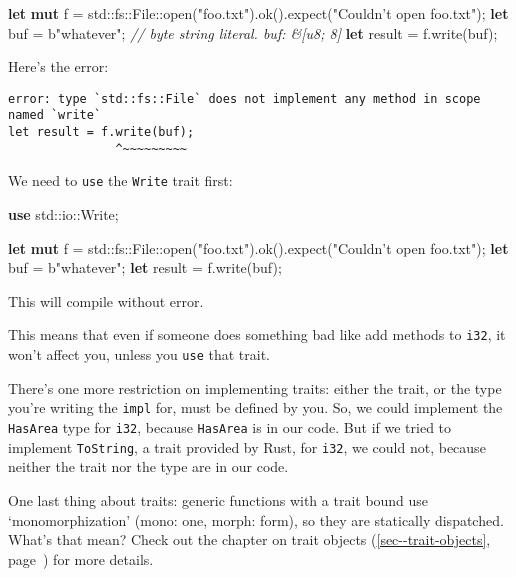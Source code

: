 \documentclass[a4paper,]{book}
\renewcommand*{\hyperref}[2][\ar]{%
  \def\ar{#2}%
  #2 (\autoref{#1}, page~\pageref{#1})}
\newenvironment{Shaded}{\begin{snugshade}}{\end{snugshade}}
\newcommand{\KeywordTok}[1]{\textcolor[rgb]{0.13,0.29,0.53}{\textbf{{#1}}}}
\newcommand{\StringTok}[1]{\textcolor[rgb]{0.31,0.60,0.02}{{#1}}}
\newcommand{\CommentTok}[1]{\textcolor[rgb]{0.56,0.35,0.01}{\textit{{#1}}}}
\newcommand{\NormalTok}[1]{{#1}}
\begin{document}
\begin{Shaded}
\begin{Highlighting}[]
\KeywordTok{let} \KeywordTok{mut} \NormalTok{f = std::fs::File::open(}\StringTok{"foo.txt"}\NormalTok{).ok().expect(}\StringTok{"Couldn’t open foo.txt"}\NormalTok{);}
\KeywordTok{let} \NormalTok{buf = b}\StringTok{"whatever"}\NormalTok{; }\CommentTok{// byte string literal. buf: &[u8; 8]}
\KeywordTok{let} \NormalTok{result = f.write(buf);}
\end{Highlighting}
\end{Shaded}

Here's the error:

\begin{verbatim}
error: type `std::fs::File` does not implement any method in scope named `write`
let result = f.write(buf);
               ^~~~~~~~~~
\end{verbatim}

We need to \texttt{use} the \texttt{Write} trait first:

\begin{Shaded}
\begin{Highlighting}[]
\KeywordTok{use} \NormalTok{std::io::Write;}

\KeywordTok{let} \KeywordTok{mut} \NormalTok{f = std::fs::File::open(}\StringTok{"foo.txt"}\NormalTok{).ok().expect(}\StringTok{"Couldn’t open foo.txt"}\NormalTok{);}
\KeywordTok{let} \NormalTok{buf = b}\StringTok{"whatever"}\NormalTok{;}
\KeywordTok{let} \NormalTok{result = f.write(buf);}
\end{Highlighting}
\end{Shaded}

This will compile without error.

This means that even if someone does something bad like add methods to
\texttt{i32}, it won't affect you, unless you \texttt{use} that trait.

There's one more restriction on implementing traits: either the trait,
or the type you're writing the \texttt{impl} for, must be defined by
you. So, we could implement the \texttt{HasArea} type for \texttt{i32},
because \texttt{HasArea} is in our code. But if we tried to implement
\texttt{ToString}, a trait provided by Rust, for \texttt{i32}, we could
not, because neither the trait nor the type are in our code.

One last thing about traits: generic functions with a trait bound use
`monomorphization' (mono: one, morph: form), so they are statically
dispatched. What's that mean? Check out the chapter on
\hyperref[sec--trait-objects]{trait objects} for more details.
\end{document}
